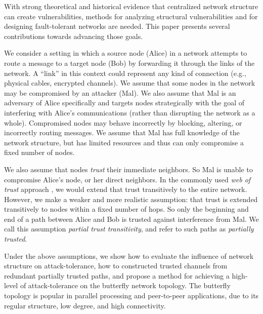 \documentclass{sig-alternate-05-2015}
\begin{document}
With strong theoretical and historical evidence that centralized
network structure can create vulnerabilities,
methods for analyzing structural vulnerabilities and for designing
fault-tolerant networks are needed.
This paper presents several contributions towards advancing those goals.

We consider a setting in which a source node (Alice)
in a network attempts to route a message
to a target node (Bob) by forwarding it through the links of the network.
A ``link'' in this context could represent any kind of connection
(e.g., physical cables, encrypted channels).
We assume that some nodes in the network may be compromised by an attacker
(Mal).
We also assume that Mal is an adversary of Alice specifically and targets
nodes strategically with the goal of interfering with Alice's communications
(rather than disrupting the network as a whole).
Compromised nodes may behave incorrectly by blocking, altering,
or incorrectly routing messages.
We assume that Mal has full knowledge of the network structure, but has
limited resources and thus can only compromise a fixed number of nodes.

We also assume that nodes {\em trust} their immediate neighbors.
So Mal is unable to compromise Alice's node, or her direct neighbors.
In the commonly used {\em web of trust} approach
\cite{zimmermann_official_1995,ferguson_practical_2003},
we would extend that trust transitively to the entire network.
However, we make a weaker and more realistic assumption:
that trust is extended transitively to nodes within a fixed
number of hops.
So only the beginning and end of a path between Alice and Bob is trusted
against interference from Mal.
We call this assumption
{\em partial trust transitivity},
and refer to such paths as {\em partially trusted}.

Under the above assumptions,
we show how to evaluate the influence of network structure
on attack-tolerance,
how to constructed trusted channels from redundant partially trusted paths,
and propose a method for achieving a high-level of attack-tolerance on
the butterfly network topology.
The butterfly topology is popular in parallel processing
\cite{kshemkalyani_distributed_2008} and
peer-to-peer \cite{lua_survey_2005, korzun_structured_2013}
applications, due to its regular structure, low degree, and high connectivity.
\end{document}
